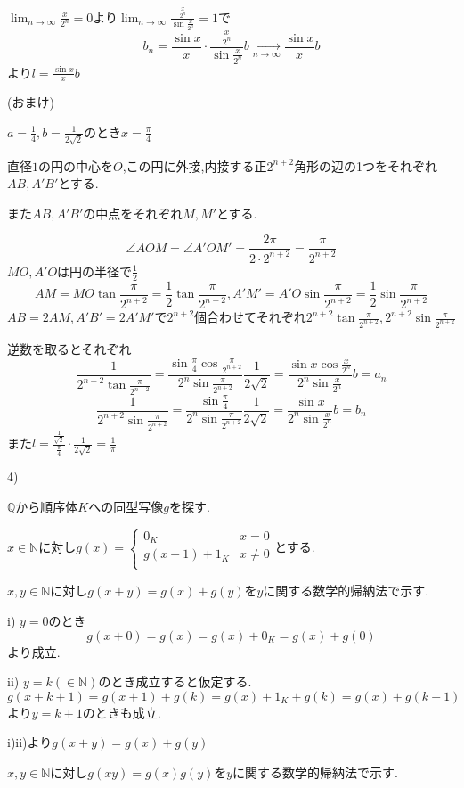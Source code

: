 \documentclass{jsarticle}
\begin{document}
$\displaystyle \lim_{n\to\infty}\frac{x}{2^n}=0$より$\displaystyle \lim_{n\to\infty}\frac{\frac{x}{2^n}}{\sin \frac{x}{2^n}}=1$で
\[b_n= \frac{\sin x}{x}\cdot\frac{\frac{x}{2^n}}{\sin \frac{x}{2^n}}b\xrightarrow[n\to\infty]{} \frac{\sin x}{x}b\]
より$l=\frac{\sin x}{x}b$

(おまけ)

$a=\frac{1}{4},b=\frac{1}{2\sqrt{2}}$のとき$x=\frac{\pi}{4}$

直径$1$の円の中心を$O$,この円に外接,内接する正$2^{n+2}$角形の辺の1つをそれぞれ$AB,A'B'$とする.

また$AB,A'B'$の中点をそれぞれ$M,M'$とする.

\[\angle AOM = \angle A'OM' = \frac{2\pi}{2\cdot 2^{n+2}}=\frac{\pi}{2^{n+2}}\]
$MO,A'O$は円の半径で$\frac{1}{2}$
\[AM=MO\tan \frac{\pi}{2^{n+2}} = \frac{1}{2}\tan\frac{\pi}{2^{n+2}},A'M' =A'O\sin \frac{\pi}{2^{n+2}} = \frac{1}{2}\sin\frac{\pi}{2^{n+2}}\]
$AB=2AM,A'B'=2A'M'$で$2^{n+2}$個合わせてそれぞれ$2^{n+2}\tan\frac{\pi}{2^{n+2}},2^{n+2}\sin\frac{\pi}{2^{n+2}}$

逆数を取るとそれぞれ
\[\frac{1}{2^{n+2}\tan\frac{\pi}{ 2^{n+2}}}=\frac{\sin \frac{\pi}{4}\cos\frac{\pi}{2^{n+2}}}{2^n\sin\frac{\pi}{2^{n+2}}}\frac{1}{2\sqrt{2}}=\frac{\sin x\cos \frac{x}{2^n}}{2^n\sin\frac{x}{2^n}}b=a_n\]
\[\frac{1}{2^{n+2}\sin\frac{\pi}{ 2^{n+2}}}=\frac{\sin \frac{\pi}{4}}{2^n\sin\frac{\pi}{2^{n+2}}}\frac{1}{2\sqrt{2}}=\frac{\sin x}{2^n\sin\frac{x}{2^n}}b=b_n\]
また$l=\frac{\frac{1}{\sqrt{2}}}{\frac{\pi}{4}}\cdot \frac{1}{2\sqrt{2}}=\frac{1}{\pi}$

4)

$\mathbb{Q}$から順序体$K$への同型写像$g$を探す.

$x\in \mathbb{N}$に対し$g(x)=\begin{cases}
0_K & x=0\\
g(x-1)+1_K & x\neq 0\\ 
\end{cases}$とする.

$x,y\in\mathbb{N}$に対し$g(x+y)=g(x)+g(y)$を$y$に関する数学的帰納法で示す.

i) $y=0$のとき
\[g(x+0)=g(x)=g(x)+0_K=g(x)+g(0)\]
より成立.

ii) $y=k(\in\mathbb{N})$のとき成立すると仮定する.
\[g(x+k+1)=g(x+1)+g(k)=g(x)+1_K+g(k)=g(x)+g(k+1)\]
より$y=k+1$のときも成立.

i)ii)より$g(x+y)=g(x)+g(y)$

$x,y\in\mathbb{N}$に対し$g(xy)=g(x)g(y)$を$y$に関する数学的帰納法で示す.
\end{document}

